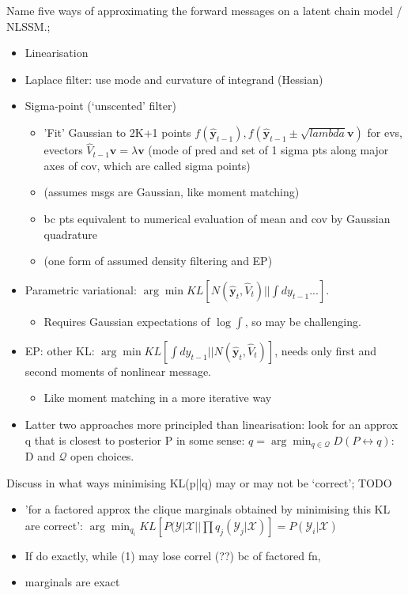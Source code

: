 \documentclass{article}
\begin{document}
Name five ways of approximating the forward messages on a latent chain model / NLSSM.; \begin{itemize} \item Linearisation \item Laplace filter: use mode and curvature of integrand (Hessian) \item Sigma-point (`unscented' filter) \begin{itemize} \item 'Fit' Gaussian to 2K+1 points $f(\hat{\mathbf{y}}_{t-1}), f(\hat{\mathbf{y}}_{t-1}\pm \sqrt{lambda}\mathbf{v})$ for evs, evectors $\hat{V}_{t-1}\mathbf{v}=\lambda\mathbf{v}$ (mode of pred and set of 1 sigma pts along major axes of cov, which are called sigma points) \item (assumes msgs are Gaussian, like moment matching) \item bc pts equivalent to numerical evaluation of mean and cov by Gaussian quadrature \item (one form of assumed density filtering and EP) \end{itemize} \item Parametric variational: $\arg\min KL [N(\mathbf{\hat{y}}_t, \hat{V}_t)||\int dy_{t-1}...]$. \begin{itemize} \item Requires Gaussian expectations of $\log \int$, so may be challenging. \end{itemize} \item EP: other KL: $\arg\min KL[\int  dy_{t-1} ||N(\hat{\mathbf{y}}_t, \hat{V}_t)]$, needs only first and second moments of nonlinear message. \begin{itemize} \item Like moment matching in a more iterative way \end{itemize} \item Latter two approaches more principled than linearisation: look for an approx q that is closest to posterior P in some sense: $q=\arg\min_{q\in\mathcal{Q}}D(P\leftrightarrow q)$: D and $\mathcal{Q}$ open choices. \end{itemize}

Discuss in what ways minimising KL(p||q) may or may not be `correct'; TODO \begin{itemize} \item 'for a factored approx the clique marginals obtained by minimising this KL are correct': $\arg\min_{q_i} KL[P(\mathcal{Y}|\mathcal{X}||\prod q_j(\mathcal{Y}_j|\mathcal{X})]=P(\mathcal{Y}_i|\mathcal{X})$ \item If do exactly, while (1) may lose correl (??) bc of factored fn, \item marginals are exact \end{itemize} 
\end{document}
